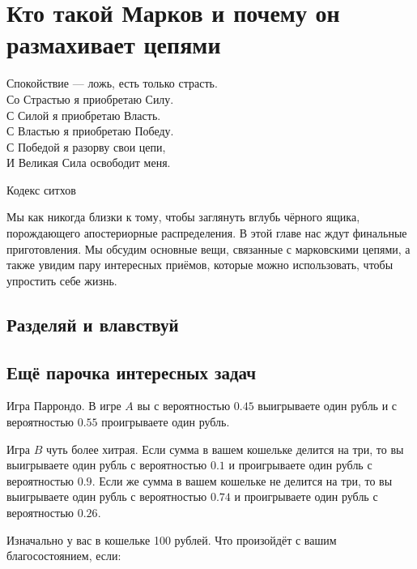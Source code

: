 \documentclass[12pt, a4paper, oneside]{extreport}
\theoremstyle{plain}              %
\theoremstyle{definition}         %
\begin{document}


\chapter{Кто такой Марков и почему он размахивает цепями}

\epigraph{Спокойствие — ложь, есть только страсть. \\
	Со Страстью я приобретаю Силу. \\
	С Силой я приобретаю Власть. \\
	С Властью я приобретаю Победу. \\
	С Победой я разорву свои цепи, \\
	И Великая Сила освободит меня.}{Кодекс ситхов}


Мы как никогда близки к тому, чтобы заглянуть вглубь чёрного ящика, порождающего апостериорные распределения. В этой главе нас ждут финальные приготовления. Мы обсудим основные вещи, связанные с марковскими цепями, а также увидим пару интересных приёмов, которые можно использовать, чтобы упростить себе жизнь. 

\section{Разделяй и влавствуй} 















\section{Ещё парочка интересных задач} 

	Игра Паррондо. В игре $A$ вы с вероятностью $0.45$ выигрываете один рубль и с вероятностью $0.55$ проигрываете один рубль. 
	
	Игра $B$ чуть более хитрая. Если сумма в вашем кошельке делится на три, то вы выигрываете один рубль с вероятностью $0.1$ и проигрываете один рубль с вероятностью $0.9$. Если же сумма в вашем кошельке не делится на три, то вы выигрываете один рубль с вероятностью $0.74$ и проигрываете один рубль с вероятностью $0.26$.
	
	Изначально у вас в кошельке 100 рублей. Что произойдёт с вашим благосостоянием, если:
	
\end{document}
